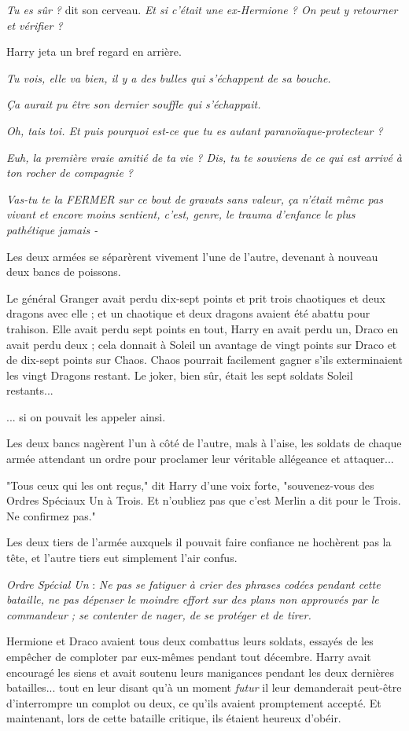 \emph{Tu es sûr ?}  dit son cerveau. \emph{Et si c'était une ex-Hermione ? On peut y retourner et vérifier ?} 

Harry jeta un bref regard en arrière.

\emph{Tu vois, elle va bien, il y a des bulles qui s'échappent de sa bouche.} 

\emph{Ça aurait pu être son dernier souffle qui s'échappait.} 

\emph{Oh, tais toi. Et puis pourquoi est-ce que tu es autant paranoïaque-protecteur ?} 

\emph{Euh, la première vraie amitié de ta vie ? Dis, tu te souviens de ce qui est arrivé à ton rocher de compagnie ?} 

\emph{Vas-tu te la FERMER sur ce bout de gravats sans valeur, ça n'était même pas vivant et encore moins sentient, c'est, genre, le trauma d'enfance le plus pathétique jamais -} 

Les deux armées se séparèrent vivement l'une de l'autre, devenant à nouveau deux bancs de poissons.

Le général Granger avait perdu dix-sept points et prit trois chaotiques et deux dragons avec elle ; et un chaotique et deux dragons avaient été abattu pour trahison. Elle avait perdu sept points en tout, Harry en avait perdu un, Draco en avait perdu deux ; cela donnait à Soleil un avantage de vingt points sur Draco et de dix-sept points sur Chaos. Chaos pourrait facilement gagner s'ils exterminaient les vingt Dragons restant. Le joker, bien sûr, était les sept soldats Soleil restants...

... si on pouvait les appeler ainsi.

Les deux bancs nagèrent l'un à côté de l'autre, mals à l'aise, les soldats de chaque armée attendant un ordre pour proclamer leur véritable allégeance et attaquer...

"Tous ceux qui les ont reçus," dit Harry d'une voix forte, "souvenez-vous des Ordres Spéciaux Un à Trois. Et n'oubliez pas que c'est Merlin a dit pour le Trois. Ne confirmez pas."

Les deux tiers de l'armée auxquels il pouvait faire confiance ne hochèrent pas la tête, et l'autre tiers eut simplement l'air confus.

\emph{Ordre Spécial Un}  : \emph{Ne pas se fatiguer à crier des phrases codées pendant cette bataille, ne pas dépenser le moindre effort sur des plans non approuvés par le commandeur ; se contenter de nager, de se protéger et de tirer.} 

Hermione et Draco avaient tous deux combattus leurs soldats, essayés de les empêcher de comploter par eux-mêmes pendant tout décembre. Harry avait encouragé les siens et avait soutenu leurs manigances pendant les deux dernières batailles... tout en leur disant qu'à un moment \emph{futur}  il leur demanderait peut-être d'interrompre un complot ou deux, ce qu'ils avaient promptement accepté. Et maintenant, lors de cette bataille critique, ils étaient heureux d'obéir.

